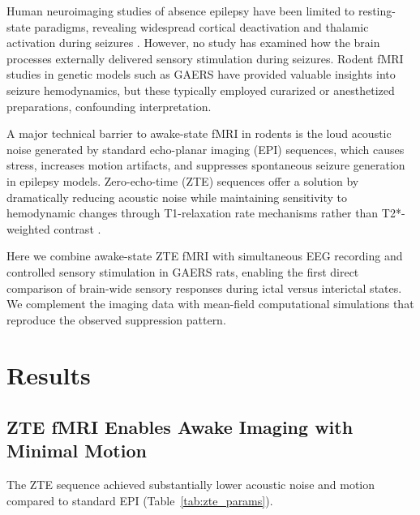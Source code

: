 \documentclass[11pt]{article}
\begin{document}
Human neuroimaging studies of absence epilepsy have been limited to resting-state paradigms, revealing widespread cortical deactivation and thalamic activation during seizures \citep{tenney2014seizures}. However, no study has examined how the brain processes externally delivered sensory stimulation during seizures. Rodent fMRI studies in genetic models such as GAERS \citep{vergnes1982spontaneous, depaulis2015gaers} have provided valuable insights into seizure hemodynamics, but these typically employed curarized or anesthetized preparations, confounding interpretation.

A major technical barrier to awake-state fMRI in rodents is the loud acoustic noise generated by standard echo-planar imaging (EPI) sequences, which causes stress, increases motion artifacts, and suppresses spontaneous seizure generation in epilepsy models. Zero-echo-time (ZTE) sequences offer a solution by dramatically reducing acoustic noise while maintaining sensitivity to hemodynamic changes through T1-relaxation rate mechanisms rather than T2*-weighted contrast \citep{madsen2015zte}.

Here we combine awake-state ZTE fMRI with simultaneous EEG recording and controlled sensory stimulation in GAERS rats, enabling the first direct comparison of brain-wide sensory responses during ictal versus interictal states. We complement the imaging data with mean-field computational simulations that reproduce the observed suppression pattern.

\section{Results}

\subsection{ZTE fMRI Enables Awake Imaging with Minimal Motion}

The ZTE sequence achieved substantially lower acoustic noise and motion compared to standard EPI (Table~\ref{tab:zte_params}).
\end{document}
